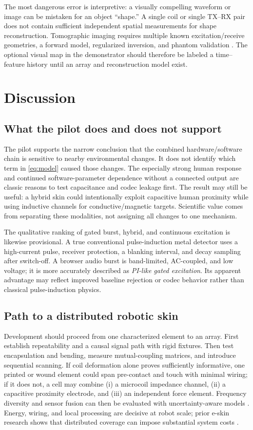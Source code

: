 \documentclass[10pt]{article}
\begin{document}
The most dangerous error is interpretive: a visually compelling waveform or image can be mistaken for an object ``shape.'' A single coil or single TX--RX pair does not contain sufficient independent spatial measurements for shape reconstruction. Tomographic imaging requires multiple known excitation/receive geometries, a forward model, regularized inversion, and phantom validation \citep{dingley2023emskin}. The optional visual map in the demonstrator should therefore be labeled a time--feature history until an array and reconstruction model exist.

\section{Discussion}
\subsection{What the pilot does and does not support}
The pilot supports the narrow conclusion that the combined hardware/software chain is sensitive to nearby environmental changes. It does not identify which term in \cref{eq:model} caused those changes. The especially strong human response and continued software-parameter dependence without a connected output are classic reasons to test capacitance and codec leakage first. The result may still be useful: a hybrid skin could intentionally exploit capacitive human proximity while using inductive channels for conductive/magnetic targets. Scientific value comes from separating these modalities, not assigning all changes to one mechanism.

The qualitative ranking of gated burst, hybrid, and continuous excitation is likewise provisional. A true conventional pulse-induction metal detector uses a high-current pulse, receiver protection, a blanking interval, and decay sampling after switch-off. A browser audio burst is band-limited, AC-coupled, and low voltage; it is more accurately described as \emph{PI-like gated excitation}. Its apparent advantage may reflect improved baseline rejection or codec behavior rather than classical pulse-induction physics.

\subsection{Path to a distributed robotic skin}
Development should proceed from one characterized element to an array. First establish repeatability and a causal signal path with rigid fixtures. Then test encapsulation and bending, measure mutual-coupling matrices, and introduce sequential scanning. If coil deformation alone proves sufficiently informative, one printed or wound element could span pre-contact and touch with minimal wiring; if it does not, a cell may combine (i) a microcoil impedance channel, (ii) a capacitive proximity electrode, and (iii) an independent force element. Frequency diversity and sensor fusion can then be evaluated with uncertainty-aware models \citep{xu2023ai}. Energy, wiring, and local processing are decisive at robot scale; prior e-skin research shows that distributed coverage can impose substantial system costs \citep{garcia2019energy,someya2019smart}.
\end{document}
